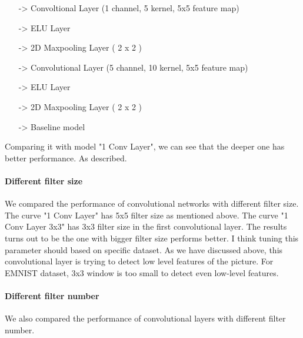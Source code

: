 \documentclass{article}
\begin{document}
\begin{itemize}
	\item[->] Convoltional Layer (1 channel, 5 kernel, 5x5 feature map)
	\item[->] ELU Layer
	\item[->] 2D Maxpooling Layer ( 2 x 2 )
	\item[->] Convolutional Layer (5 channel, 10 kernel, 5x5 feature map)
	\item[->] ELU Layer
	\item[->] 2D Maxpooling Layer ( 2 x 2 )
	\item[->] Baseline model
\end{itemize}

Comparing it with model "1 Conv Layer", we can see that the deeper one has better performance. As \citep{Lecun98gradient-basedlearning} described.

\paragraph{Different filter size}
We compared the performance of convolutional networks with different filter size. The curve "1 Conv Layer" has 5x5 filter size as mentioned above. The curve "1 Conv Layer 3x3" has 3x3 filter size in the first convolutional layer. The results turns out to be the one with bigger filter size performs better. I think tuning this parameter should based on specific dataset. As we have discussed above, this convolutional layer is trying to detect low level features of the picture. For EMNIST dataset, 3x3 window is too small to detect even low-level features.

\paragraph{Different filter number}
We also compared the performance of convolutional layers with different filter number. 




\end{document}
